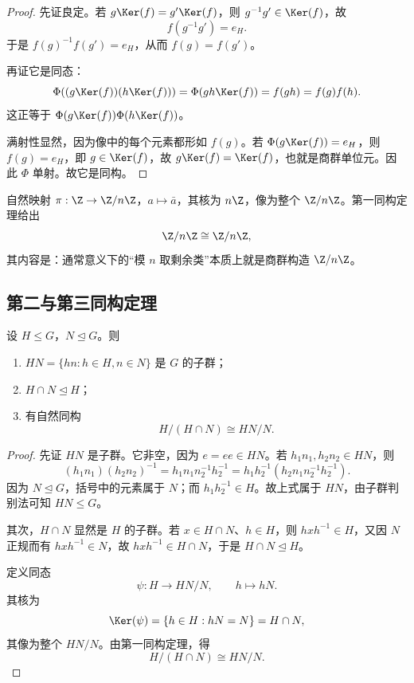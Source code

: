\begin{proof}
先证良定。若 $g\Ker(f)=g'\Ker(f)$，则 $g^{-1}g'\in \Ker(f)$，故
\[
 f(g^{-1}g')=e_H.
\]
于是 $f(g)^{-1}f(g')=e_H$，从而 $f(g)=f(g')$。

再证它是同态：
\[
 \Phi((g\Ker(f))(h\Ker(f)))=\Phi(gh\Ker(f))=f(gh)=f(g)f(h).
\]
这正等于 $\Phi(g\Ker(f))\Phi(h\Ker(f))$。

满射性显然，因为像中的每个元素都形如 $f(g)$。若 $\Phi(g\Ker(f))=e_H$，则 $f(g)=e_H$，即 $g\in \Ker(f)$，故 $g\Ker(f)=\Ker(f)$，也就是商群单位元。因此 $\Phi$ 单射。故它是同构。
\end{proof}

\begin{example}
自然映射 $\pi:\Z\to \Z/n\Z$，$a\mapsto \bar a$，其核为 $n\Z$，像为整个 $\Z/n\Z$。第一同构定理给出
\[
 \Z/n\Z \cong \Z/n\Z,
\]
其内容是：通常意义下的“模 $n$ 取剩余类”本质上就是商群构造 $\Z/n\Z$。
\end{example}

\subsection*{第二与第三同构定理}

\begin{theorem}[第二同构定理]
设 $H\le G$，$N\trianglelefteq G$。则
\begin{enumerate}[label=\textnormal{(\arabic*)}, leftmargin=3em]
  \item $HN=\{hn:h\in H,n\in N\}$ 是 $G$ 的子群；
  \item $H\cap N\trianglelefteq H$；
  \item 有自然同构
  \[
    H/(H\cap N) \cong HN/N.
  \]
\end{enumerate}
\end{theorem}

\begin{proof}
先证 $HN$ 是子群。它非空，因为 $e=ee\in HN$。若 $h_1n_1,h_2n_2\in HN$，则
\[
 (h_1n_1)(h_2n_2)^{-1}=h_1n_1n_2^{-1}h_2^{-1}=h_1h_2^{-1}(h_2n_1n_2^{-1}h_2^{-1}).
\]
因为 $N\trianglelefteq G$，括号中的元素属于 $N$；而 $h_1h_2^{-1}\in H$。故上式属于 $HN$，由子群判别法可知 $HN\le G$。

其次，$H\cap N$ 显然是 $H$ 的子群。若 $x\in H\cap N$、$h\in H$，则 $hxh^{-1}\in H$，又因 $N$ 正规而有 $hxh^{-1}\in N$，故 $hxh^{-1}\in H\cap N$，于是 $H\cap N\trianglelefteq H$。

定义同态
\[
 \psi:H \longrightarrow HN/N, \qquad h \longmapsto hN.
\]
其核为
\[
 \Ker(\psi)=\{h\in H:hN=N\}=H\cap N,
\]
其像为整个 $HN/N$。由第一同构定理，得
\[
 H/(H\cap N) \cong HN/N.
\]
\end{proof}

